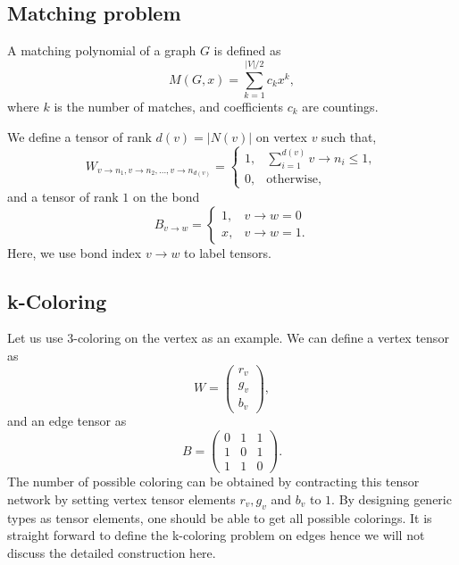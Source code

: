 \documentclass[onefignum, onetabnum]{siamart190516}
\newcommand{\<}{\langle}
\renewcommand{\>}{\rangle}
\newcounter{example}
\begin{document}
\subsection{Matching problem}
A matching polynomial of a graph $G$ is defined as
\begin{equation}
    M(G, x) = \sum\limits_{k=1}^{|V|/2} c_k x^k,
\end{equation}
where $k$ is the number of matches, and coefficients $c_k$ are countings.

We define a tensor of rank $d(v) = |N(v)|$ on vertex $v$ such that,
\begin{equation}
    W_{v\rightarrow n_1, v\rightarrow n_2, \ldots, v\rightarrow n_{d(v)}} = \begin{cases}
        1, & \sum_{i=1}^{d(v)} v\rightarrow n_i \leq 1,\\
        0, & \text{otherwise},
    \end{cases}
\end{equation}
and a tensor of rank $1$ on the bond
\begin{equation}
    B_{v\rightarrow w} = \begin{cases}
    1, & v \rightarrow w = 0 \\
    x, & v \rightarrow w = 1.
\end{cases}
\end{equation}
Here, we use bond index $v \rightarrow w$ to label tensors.

\subsection{k-Coloring}
Let us use 3-coloring on the vertex as an example. We can define a vertex tensor as
\begin{equation}
    W = \left(\begin{matrix}
        r_v\\
        g_v\\
        b_v
    \end{matrix}\right),
\end{equation}
and an edge tensor as
\begin{equation}
    B = \left(\begin{matrix}
        0 & 1 & 1\\
        1 & 0 & 1\\
        1 & 1 & 0
    \end{matrix}\right).
\end{equation}
The number of possible coloring can be obtained by contracting this tensor network by setting vertex tensor elements $r_v, g_v$ and $b_v$ to $1$.
By designing generic types as tensor elements, one should be able to get all possible colorings.
It is straight forward to define the k-coloring problem on edges hence we will not discuss the detailed construction here.
\end{document}

